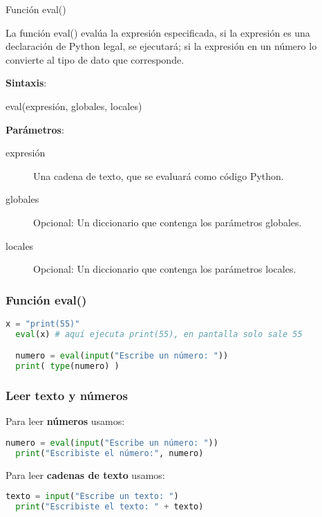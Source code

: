 \begin{frame}[c]{Función eval()}

  La función \textcolor{codeKeyword2}{eval}() evalúa la expresión
  especificada, si la expresión es una declaración de Python legal,
  se ejecutará; si la expresión en un número lo convierte al tipo de
  dato que corresponde.

  \vspace{\baselineskip}
  \textbf{Sintaxis}:

  \vspace{\baselineskip}
  \textcolor{codeKeyword2}{eval}(expresión, globales, locales)

  \vspace{\baselineskip}
  \textbf{Parámetros}:
  \begin{description}
    \item[expresión] Una cadena de texto, que se evaluará como código
      Python.
    \item[globales] Opcional: Un diccionario que contenga los parámetros
      globales.
    \item[locales] Opcional: Un diccionario que contenga los parámetros
      locales.
  \end{description}
\end{frame}

\begin{frame}[fragile]
  \frametitle{Función eval()}

  \begin{lstlisting}[language=Python]
  x = "print(55)"
  eval(x) # aquí ejecuta print(55), en pantalla solo sale 55

  numero = eval(input("Escribe un número: "))
  print( type(numero) )
  \end{lstlisting}
\end{frame}


\begin{frame}[fragile]
  \frametitle{Leer texto y números}

  Para leer \textbf{números} usamos:
  \begin{lstlisting}[language=Python]
  numero = eval(input("Escribe un número: "))
  print("Escribiste el número:", numero)
  \end{lstlisting}

  \vspace{\baselineskip}
  Para leer \textbf{cadenas de texto} usamos:
  \begin{lstlisting}[language=Python]
  texto = input("Escribe un texto: ")
  print("Escribiste el texto: " + texto)
  \end{lstlisting}

\end{frame}

